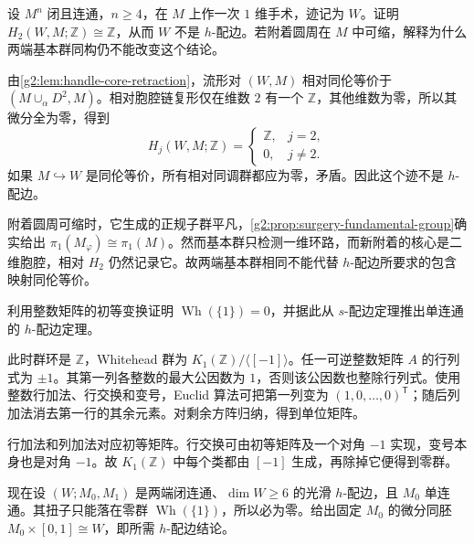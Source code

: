 \begin{exercise}\label{g2:ex:surgery-trace-not-h-cobordism}
	设 \(M^n\) 闭且连通，\(n\ge4\)，在 \(M\) 上作一次 \(1\) 维手术，迹记为 \(W\)。证明 \(H_2(W,M;\mathbb Z)\cong\mathbb Z\)，从而 \(W\) 不是 \(h\)-配边。若附着圆周在 \(M\) 中可缩，解释为什么两端基本群同构仍不能改变这个结论。
\end{exercise}
\begin{solution}
	由\cref{g2:lem:handle-core-retraction}，流形对 \((W,M)\) 相对同伦等价于 \((M\cup_\alpha D^2,M)\)。相对胞腔链复形仅在维数 \(2\) 有一个 \(\mathbb Z\)，其他维数为零，所以其微分全为零，得到
	\[
		H_j(W,M;\mathbb Z)=
		\begin{cases}\mathbb Z,&j=2,\\0,&j\ne2.\end{cases}
	\]
	如果 \(M\hookrightarrow W\) 是同伦等价，所有相对同调群都应为零，矛盾。因此这个迹不是 \(h\)-配边。

	附着圆周可缩时，它生成的正规子群平凡，\cref{g2:prop:surgery-fundamental-group}确实给出 \(\pi_1(M_\varphi)\cong\pi_1(M)\)。然而基本群只检测一维环路，而新附着的核心是二维胞腔，相对 \(H_2\) 仍然记录它。故两端基本群相同不能代替 \(h\)-配边所要求的包含映射同伦等价。
\end{solution}

\begin{exercise}\label{g2:ex:trivial-whitehead-group}
	利用整数矩阵的初等变换证明 \(\operatorname{Wh}(\{1\})=0\)，并据此从 \(s\)-配边定理推出单连通的 \(h\)-配边定理。
\end{exercise}
\begin{solution}
	此时群环是 \(\mathbb Z\)，Whitehead 群为 \(K_1(\mathbb Z)/\langle[-1]\rangle\)。任一可逆整数矩阵 \(A\) 的行列式为 \(\pm1\)。其第一列各整数的最大公因数为 \(1\)，否则该公因数也整除行列式。使用整数行加法、行交换和变号，Euclid 算法可把第一列变为 \((1,0,\ldots,0)^{\mathsf T}\)；随后列加法消去第一行的其余元素。对剩余方阵归纳，得到单位矩阵。

	行加法和列加法对应初等矩阵。行交换可由初等矩阵及一个对角 \(-1\) 实现，变号本身也是对角 \(-1\)。故 \(K_1(\mathbb Z)\) 中每个类都由 \([-1]\) 生成，再除掉它便得到零群。

	现在设 \((W;M_0,M_1)\) 是两端闭连通、\(\dim W\ge6\) 的光滑 \(h\)-配边，且 \(M_0\) 单连通。其扭子只能落在零群 \(\operatorname{Wh}(\{1\})\)，所以必为零。给出固定 \(M_0\) 的微分同胚 \(M_0\times[0,1]\cong W\)，即所需 \(h\)-配边结论。
\end{solution}

